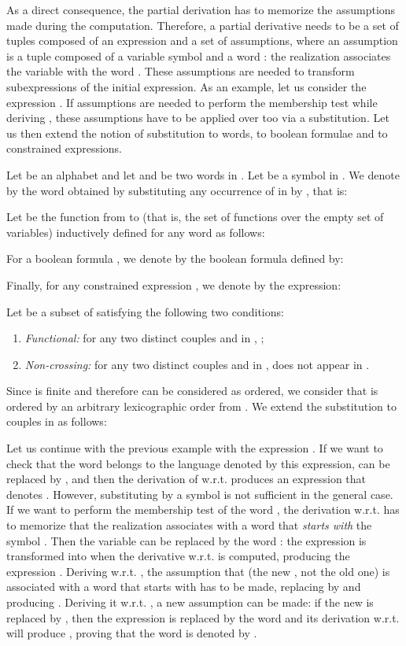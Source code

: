 \documentclass[a4paper]{llncs}
\begin{document}
  As a direct consequence, the partial derivation has to memorize the assumptions made during the computation. Therefore, a partial derivative needs to be a set of tuples composed of an expression and a set of assumptions, where an assumption is a tuple composed of a variable symbol  and a word : the realization associates the variable  with the word .    
These assumptions are needed to transform subexpressions of the initial expression. As an example, let us consider the expression . If assumptions are needed to perform the membership test while deriving , these assumptions have to be applied over  too via a substitution. Let us then extend the notion of substitution to words, to boolean formulae and to constrained expressions.



  Let  be an alphabet and let  and  be two words in . Let  be a symbol in . We denote by  the word obtained by substituting any occurrence of  in  by , that is:
  
    \begin{definition}[ Function]
     Let  be the function from  to  (that is, the set of functions over the empty set of variables) inductively defined for any word  as follows:
        
  \end{definition}
  For a boolean formula , we denote by  the boolean formula defined by:  
  
  Finally, for any constrained expression , we denote by  the expression:
  
 Let  be a subset of  satisfying the following two conditions:
 \begin{enumerate}
   \item \emph{Functional:} for any two distinct couples  and  in , ;
   \item \emph{Non-crossing: }for any two distinct couples  and  in ,  does not appear in .
 \end{enumerate}
 Since  is finite and therefore can be considered as ordered, we consider that  is ordered by an arbitrary lexicographic order from .
 We extend the substitution to couples in  as follows:
  
  


  Let us continue with the previous example with the expression . If we want to check that the word  belongs to the language denoted by this expression,  can be replaced by , and then the derivation of  w.r.t.  produces an expression that denotes . However, substituting  by a symbol is not sufficient in the general case. If we want to perform the membership test of the word , the derivation w.r.t.  has to memorize that the realization associates  with a word that \emph{starts with} the symbol . Then the variable  can be replaced by the word : the expression  is transformed into  when the derivative w.r.t.  is computed, producing the expression . Deriving w.r.t. , the assumption that  (the new , not the old one) is associated with a word that starts with  has to be made, replacing  by  and producing . Deriving it w.r.t. , a new assumption can be made: if the new  is replaced by , then the expression  is replaced by the word  and its derivation w.r.t.  will produce , proving  that the word  is denoted by .
  
\end{document}
